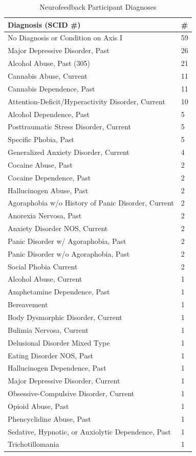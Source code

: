 \begin{table}[h!]
\caption{Neurofeedback Participant Diagnoses}
      \begin{tabular}{ p{7cm} p{0.4cm} }
        \textbf{Diagnosis (SCID \#)} & \textbf{\#} \\ \hline
        No Diagnosis or Condition on Axis I & 59  \\
        Major Depressive Disorder, Past & 26  \\
        Alcohol Abuse, Past (305) & 21  \\
        Cannabis Abuse, Current & 11  \\
        Cannabis Dependence, Past & 11  \\
        Attention-Deficit/Hyperactivity Disorder, Current & 10  \\
        Alcohol Dependence, Past & 5  \\
        Posttraumatic Stress Disorder, Current & 5  \\
        Specific Phobia, Past & 5  \\
        Generalized Anxiety Disorder, Current & 4  \\
        Cocaine Abuse, Past & 2  \\
        Cocaine Dependence, Past & 2  \\
        Hallucinogen Abuse, Past & 2  \\
        Agoraphobia w/o History of Panic Disorder, Current & 2  \\
        Anorexia Nervosa, Past & 2  \\
        Anxiety Disorder NOS, Current & 2  \\
        Panic Disorder w/ Agoraphobia, Past & 2  \\
        Panic Disorder w/o Agoraphobia, Past & 2  \\
        Social Phobia Current & 2  \\
        Alcohol Abuse, Current & 1  \\
        Amphetamine Dependence, Past & 1  \\
        Bereavement & 1  \\
        Body Dysmorphic Disorder, Current & 1  \\
        Bulimia Nervosa, Current & 1  \\
        Delusional Disorder Mixed Type & 1  \\
        Eating Disorder NOS, Past & 1  \\
        Hallucinogen Dependence, Past & 1  \\
        Major Depressive Disorder, Current & 1  \\
        Obsessive-Compulsive Disorder, Current & 1  \\
        Opioid Abuse, Past  & 1  \\
        Phencyclidine Abuse, Past & 1  \\
        Sedative, Hypnotic, or Anxiolytic Dependence, Past & 1 \\
        Trichotillomania & 1  \\
        \hline
      \end{tabular}
\label{psych}
\end{table}

